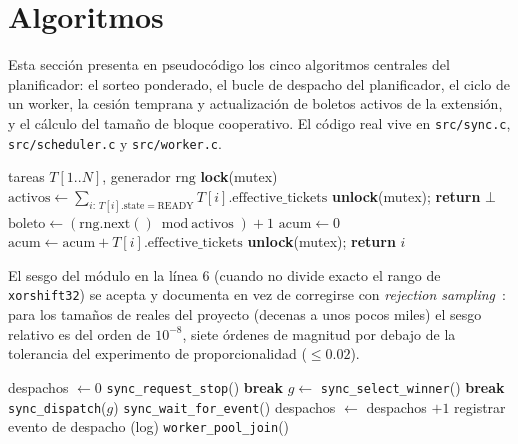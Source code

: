 \section{Algoritmos}
\label{sec:algoritmos}

Esta sección presenta en pseudocódigo los cinco algoritmos centrales del
planificador: el sorteo ponderado, el bucle de despacho del planificador, el
ciclo de un worker, la cesión temprana y actualización de boletos activos de
la extensión, y el cálculo del tamaño de bloque cooperativo. El código real
vive en \texttt{src/sync.c}, \texttt{src/scheduler.c} y
\texttt{src/worker.c}.

\begin{algorithm}[htbp]
\caption{Sorteo ponderado (\texttt{sync\_select\_winner})}
\label{alg:sorteo}
\begin{algorithmic}[1]
\REQUIRE tareas $T[1..N]$, generador $\text{rng}$
\STATE \textbf{lock}(mutex)
\STATE $\text{activos} \gets \sum_{i:\, T[i].\text{state}=\text{READY}} T[i].\text{effective\_tickets}$
  \STATE \textbf{unlock}(mutex); \textbf{return} $\bot$ 
\ENDIF
\STATE $\text{boleto} \gets (\text{rng.next}() \bmod \text{activos}) + 1$
\STATE $\text{acum} \gets 0$
    \STATE $\text{acum} \gets \text{acum} + T[i].\text{effective\_tickets}$
      \STATE \textbf{unlock}(mutex); \textbf{return} $i$ 
    \ENDIF
  \ENDIF
\ENDFOR
\end{algorithmic}
\end{algorithm}

El sesgo del módulo en la línea 6 (cuando  no divide exacto el
rango de \texttt{xorshift32}) se acepta y documenta en vez de corregirse con
\textit{rejection sampling}~\cite{Lemire2019}: para los tamaños de
 reales del
proyecto (decenas a unos pocos miles) el sesgo relativo es del orden de
$10^{-8}$, siete órdenes de magnitud por debajo de la tolerancia del
experimento de proporcionalidad ($\leq 0.02$).

\begin{algorithm}[htbp]
\caption{Bucle del planificador (\texttt{scheduler\_run}, hilo principal)}
\label{alg:bucle}
\begin{algorithmic}[1]
\STATE despachos $\gets 0$
\LOOP
    \STATE \texttt{sync\_request\_stop}() 
    \STATE \textbf{break}
  \ENDIF
  \STATE $g \gets$ \texttt{sync\_select\_winner}()
    \STATE \textbf{break} 
  \ENDIF
  \STATE \texttt{sync\_dispatch}($g$) 
  \STATE \texttt{sync\_wait\_for\_event}() 
  \STATE despachos $\gets$ despachos $+ 1$
  \STATE registrar evento de despacho (log)
\ENDLOOP
\STATE \texttt{worker\_pool\_join}()
\end{algorithmic}
\end{algorithm}

